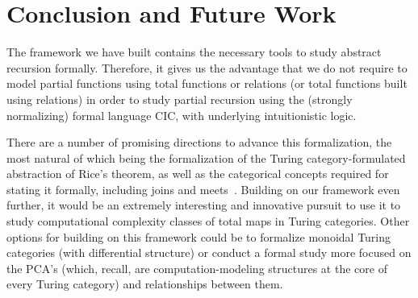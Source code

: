 \documentclass{entcs} \usepackage{entcsmacro}
\begin{document}
\section{Conclusion and Future Work}

The framework we have built contains the necessary tools to study abstract recursion formally. Therefore, it gives us the advantage that we do not require to model partial functions using total functions or relations (or total functions built using relations) in order to study partial recursion using the (strongly normalizing) formal language CIC, with underlying intuitionistic logic. 

There are a number of promising directions to advance this formalization, the most natural of which being the formalization of the Turing category-formulated abstraction of Rice's theorem, as well as the categorical concepts required for stating it formally, including joins and meets~\cite{Estonia}. Building on our framework even further, it would be an extremely interesting and innovative pursuit to use it to study computational complexity classes of total maps in Turing categories. Other options for building on this framework could be to formalize monoidal Turing categories (with differential structure) or conduct a formal
study more focused on the PCA's (which, recall, are computation-modeling structures
at the core of every Turing category) and relationships between them. 



	
	
	
	
	
\end{document}
